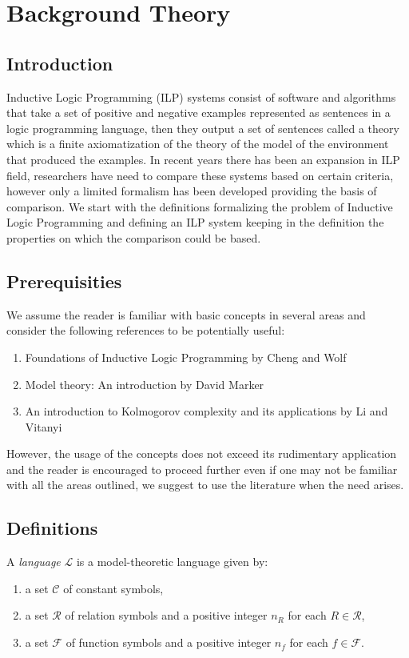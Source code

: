 
\chapter{Background Theory}


\section{Introduction}
Inductive Logic Programming (ILP) systems consist of software and algorithms that take a set of positive and negative examples represented as sentences in a logic programming language, then they output a set of sentences called a theory which is a finite axiomatization of the theory of the model of the environment that produced the examples. In recent years there has been an expansion in ILP field, researchers have need to compare these systems based on certain criteria, however only a limited formalism has been developed providing the basis of comparison.
We start with the definitions formalizing the problem of Inductive Logic Programming and defining an ILP system keeping in the definition the properties on which the comparison could be based.

\section{Prerequisities}
We assume the reader is familiar with basic concepts in several areas and consider the following references to be potentially useful:
\begin{enumerate}
\item Foundations of Inductive Logic Programming by Cheng and Wolf \cite{cheng1997}
\item Model theory: An introduction by David Marker \cite{marker2002}
\item An introduction to Kolmogorov complexity and its applications by Li and Vitanyi \cite{li1997}
\end{enumerate}
However, the usage of the concepts does not exceed its rudimentary application and the reader is encouraged to proceed further even if one may not be familiar with all the areas outlined, we suggest to use the literature when the need arises.
\section{Definitions}

\begin{defn}
A \emph{language} $\mathcal{L}$ is a model-theoretic language given by:
\begin{enumerate}
\item a set $\mathcal{C}$ of constant symbols,
\item a set $\mathcal{R}$ of relation symbols and a positive integer $n_R$ for each $R \in \mathcal{R}$,
\item a set $\mathcal{F}$ of function symbols and a positive integer $n_f$ for each $f \in \mathcal{F}$.
\end{enumerate}
\end{defn}

